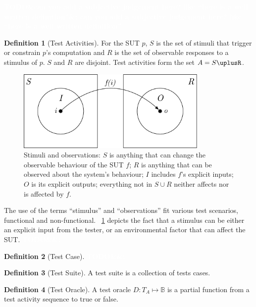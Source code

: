 \documentclass[11pt]{sdm_internship}
\newcommand{\todo}[1]{\colorbox{Red!75}{\textcolor{white}{\textbf{TODO\ifx&#1&\else: #1\fi}}}}
\theoremstyle{definition}
\newtheorem{definition}{Definition}[section]
\begin{document}
\todo{can you add a subjective judgement here? like ``here is a well written definition''}

\begin{definition}[Test Activities]
  For the SUT $p$, $S$ is the set of stimuli that trigger or constrain $p$'s computation and $R$ is the set of observable responses to a stimulus of $p$.
  $S$ and $R$ are disjoint.
  Test activities form the set $A = S\uplusR$.
\end{definition}


\begin{figure}
  \centering
  \includegraphics[width=25em]{stim_and_obs}
  \caption{Stimuli and observations: $S$ is anything that can change the observable behaviour of the SUT $f$; $R$ is anything that can be observed about the system's behaviour; $I$ includes $f$'s explicit inputs; $O$ is its explicit outputs; everything not in $S \cup R$ neither affects nor is affected by $f$.}%
  \label{fig:test_activity}
\end{figure}

The use of the terms ``stimulus'' and ``observations'' fit various test scenarios, functional and non-functional.
\figurename~\ref{fig:test_activity} depicts the fact that a stimulus can be either an explicit input from the tester, or an environmental factor that can affect the SUT\@.
\todo{}

\begin{definition}[Test Case]
  \todo{}
\end{definition}

\begin{definition}[Test Suite]
  A test suite is a collection of tests cases.
\end{definition}

\begin{definition}[Test Oracle]
  A test oracle $D : T_A \mapsto \mathbb{B}$ is a partial function from a test activity sequence to true or false.
\end{definition}
\end{document}
